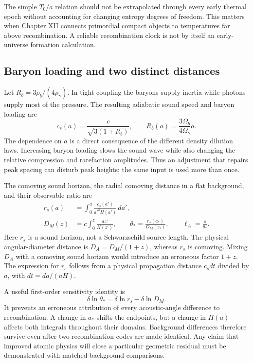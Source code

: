 The simple $T_0/a$ relation should not be extrapolated through every early thermal epoch without accounting for changing entropy degrees of freedom. This matters when Chapter XII connects primordial compact objects to temperatures far above recombination. A reliable recombination clock is not by itself an early-universe formation calculation.

\subsection{Baryon loading and two distinct distances}

Let $R_b=3\rho_b/(4\rho_\gamma)$. In tight coupling the baryons supply inertia while photons supply most of the pressure. The resulting adiabatic sound speed and baryon loading are
\begin{equation}
 c_s(a)=\frac{c}{\sqrt{3(1+R_b)}},\qquad
 R_b(a)=\frac{3\Omega_b}{4\Omega_\gamma}a.
\label{c9:soundspeed}
\end{equation}
The dependence on $a$ is a direct consequence of the different density dilution laws. Increasing baryon loading slows the sound wave while also changing the relative compression and rarefaction amplitudes. Thus an adjustment that repairs peak spacing can disturb peak heights; the same input is used more than once.

The comoving sound horizon, the radial comoving distance in a flat background, and their observable ratio are
\begin{align}
 r_s(a)&=\int_0^a\frac{c_s(a')}{a'^2H(a')}\,da',\label{c9:rs}\\
 D_M(z)&=c\int_0^z\frac{dz'}{H(z')},\qquad
 \theta_* =\frac{r_s(a_*)}{D_M(z_*)},\qquad \ell_A=\frac{\pi}{\theta_*}.
 \label{c9:angle}
\end{align}
Here $r_s$ is a sound horizon, not a Schwarzschild source length. The physical angular-diameter distance is $D_A=D_M/(1+z)$, whereas $r_s$ is comoving. Mixing $D_A$ with a comoving sound horizon would introduce an erroneous factor $1+z$. The expression for $r_s$ follows from a physical propagation distance $c_sdt$ divided by $a$, with $dt=da/(aH)$.

A useful first-order sensitivity identity is
\begin{equation}
 \delta\ln\theta_* =\delta\ln r_s-\delta\ln D_M.
 \label{c9:sensitivity}
\end{equation}
It prevents an erroneous attribution of every acoustic-angle difference to recombination. A change in $a_*$ shifts the endpoints, but a change in $H(a)$ affects both integrals throughout their domains. Background differences therefore survive even after two recombination codes are made identical. Any claim that improved atomic physics will close a particular geometric residual must be demonstrated with matched-background comparisons.


